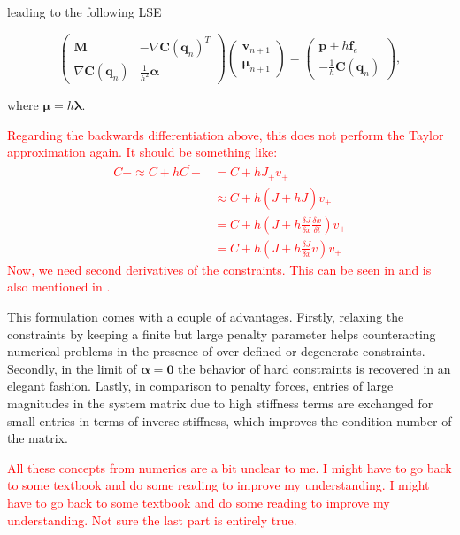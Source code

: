 \noindent leading to the following LSE \cite{tournier2015}

\[
\begin{pmatrix}
    \bm{M} & -\nabla \bm{C}(\bm{q}_n)^T \\
    \nabla \bm{C}(\bm{q}_n) & \frac{1}{h^2}\bm{\alpha}
\end{pmatrix}
\begin{pmatrix}
    \bm{v}_{n+1} \\
    \bm{\mu}_{n+1}
\end{pmatrix}
=
\begin{pmatrix}
    \bm{p} + h\bm{f}_e \\
    - \frac{1}{h}\bm{C}(\bm{q}_n)
\end{pmatrix},
\]

\noindent where $\bm{\mu} = h\bm{\lambda}$.

\textcolor{red}{Regarding the backwards differentiation above, this does not perform the Taylor approximation again. It should be something
like:
\begin{align*}
    C+ \approx C + h\dot{C+} &= C + hJ_+v_+ \\
                                        &\approx C + h(J + h\dot{J})v_+ \\
                                        &= C + h(J + h\frac{\delta J}{\delta x}\frac{\delta x}{\delta t})v_+ \\
                                        &= C + h(J + h\frac{\delta J}{\delta x}v)v_+
\end{align*}
Now, we need second derivatives of the constraints. This can be seen in \cite{baraff1998} and is also mentioned in \cite{servin2006}.
}

This formulation comes with a couple of advantages. Firstly, relaxing the constraints by keeping a finite but large penalty parameter helps
counteracting numerical problems in the presence of over defined or degenerate constraints. Secondly, in the limit of $\bm{\alpha} = \bm{0}$ 
the behavior of hard constraints is recovered in an elegant fashion. Lastly, in comparison to penalty forces, 
entries of large magnitudes in the system matrix due to high stiffness terms are exchanged for small entries in terms of inverse stiffness, 
which improves the condition number of the matrix. 

\textcolor{red}{
    All these concepts from numerics are a bit unclear to me. I might have to go back to some textbook and do some reading to improve my understanding. 
    I might have to go back to some textbook and do some reading to improve my understanding. Not sure the last part is entirely true.}

